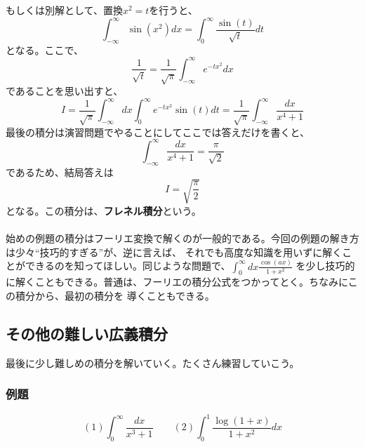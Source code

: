 \documentclass[a4j,dvipdfmx]{jsarticle}
\begin{document}
もしくは別解として、置換$x^2=t$を行うと、
\begin{equation*}
    \int_{-\infty}^\infty \sin(x^2)dx=\int_{0}^{\infty}\frac{\sin(t)}{\sqrt{t}}dt
\end{equation*}
となる。ここで、
\begin{equation*}
    \frac{1}{\sqrt{t}}=\frac{1}{\sqrt{\pi}}\int_{-\infty}^{\infty}e^{-tx^2}dx
\end{equation*}
であることを思い出すと、
\begin{equation*}
    I=\frac{1}{\sqrt{\pi}}\int_{-\infty}^{\infty}dx\int_{0}^{\infty}e^{-tx^2}\sin(t)dt=\frac{1}{\sqrt{\pi}}\int_{-\infty}^{\infty}\frac{dx}{x^4+1}
\end{equation*}
最後の積分は演習問題でやることにしてここでは答えだけを書くと、
\begin{equation*}
    \int_{-\infty}^{\infty}\frac{dx}{x^4+1}=\frac{\pi}{\sqrt{2}}
\end{equation*}
であるため、結局答えは
\begin{equation*}
    I=\sqrt{\frac{\pi}{2}}
\end{equation*}
となる。この積分は、\textbf{フレネル積分}という。\\
\hrulefill\\
始めの例題の積分はフーリエ変換で解くのが一般的である。今回の例題の解き方は少々``技巧的すぎる''が、逆に言えば、
それでも高度な知識を用いずに解くことができるのを知ってほしい。同じような問題で、$\displaystyle \int_0^\infty dx\frac{\cos(ax)}{1+x^2}$
を少し技巧的に解くこともできる。普通は、フーリエの積分公式をつかってとく。ちなみにこの積分から、最初の積分を
導くこともできる。
\newpage
\subsection{その他の難しい広義積分}
最後に少し難しめの積分を解いていく。たくさん練習していこう。
\subsubsection*{例題}
\begin{equation*}
    (1)\int_0^\infty \frac{dx}{x^3+1}\qquad(2)\int_0^1\frac{\log(1+x)}{1+x^2}dx
\end{equation*}
\end{document}

